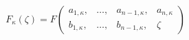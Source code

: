 \begin{equation}
F_{\kappa}(\zeta)=F \left(
\begin{array}{cccc}
a_{1,\kappa}, & \dots, & a_{n-1,\kappa}, & a_{n,\kappa}\\
b_{1,\kappa}, & \dots, & b_{n-1,\kappa}, & \zeta
\end{array}
\right)
\end{equation}

